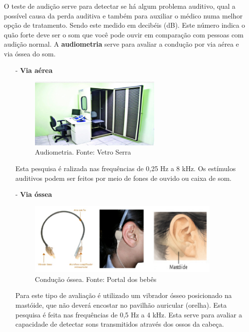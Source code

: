 \documentclass[brasil]{abnt}
\begin{document}
	O teste de audição serve para detectar se há algum problema auditivo, qual a possível causa da perda auditiva e também para auxiliar o médico numa melhor opção de tratamento.
	Sendo este medido em decibéis (dB). Este número indica o quão forte deve ser o som que você pode ouvir em comparação com pessoas com audição normal. A \textbf{audiometria} serve para avaliar 
	a condução por via aérea e via óssea do som.
				
		\begin{itemize}
		
			\item [-] \textbf{Via aérea}
				\begin{figure}[!htb]
					\center
					\includegraphics[width=65mm]{ava.png}
					\caption{Audiometria. Fonte: Vetro Serra}
				\end{figure}
					
			Esta pesquisa é ralizada nas frequências de 0,25 Hz a 8 kHz. Os estímulos auditivos podem ser feitos por meio de fones de ouvido ou caixa de som. 

			\item [-] \textbf{Via óssea}
				\begin{figure}[!htb]
					\center
					\includegraphics[width=95mm]{mvo.png}
					\caption{Condução óssea. Fonte: Portal dos bebês}
				\end{figure}
											
			Para este tipo de avaliação é utilizado um vibrador ósseo posicionado na mastóide, que não deverá encostar no pavilhão auricular (orelha). Esta pesquisa é feita nas frequências de 0,5 Hz a 4 kHz. Esta serve para avaliar a capacidade de detectar 
			sons transmitidos através dos ossos da cabeça. 
					
		\end{itemize}			
    
\end{document}
